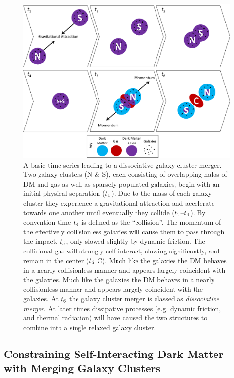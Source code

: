 \begin{figure}
\centering
\includegraphics[width=6in]{Chapter1/MergerTimeSeries.png}
\caption[A basic time series leading to a dissociative galaxy cluster merger.]{A basic time series leading to a dissociative galaxy cluster merger.
Two galaxy clusters (N \& S), each consisting of overlapping halos of DM and gas as well as sparsely populated galaxies, begin with an initial physical separation ($t_{\rm 1}$).
Due to the mass of each galaxy cluster they experience a gravitational attraction and accelerate towards one another until eventually they collide ($t_{\rm 1}$--$t_{\rm 4}$).
By convention time $t_{\rm 4}$ is defined as the ``collision''.
The momentum of the effectively collisionless galaxies will cause them to pass through the impact, $t_{\rm 5}$, only slowed slightly by dynamic friction. 
The collisional gas will strongly self-interact, slowing significantly, and remain in the center ($t_{\rm 6}$ C).
Much like the galaxies the DM behaves in a nearly collisionless manner and appears largely coincident with the galaxies.
Much like the galaxies the DM behaves in a nearly collisionless manner and appears largely coincident with the galaxies.
At $t_{\rm 6}$ the galaxy cluster merger is classed as \emph{dissociative merger}.
At later times dissipative processes (e.g. dynamic friction, and thermal radiation) will have caused the two structures to combine into a single relaxed galaxy cluster.
\label{fig:MergerTimeSeries}}
\end{figure}  

\subsection{Constraining Self-Interacting Dark Matter with Merging Galaxy Clusters}\label{section:DMconstraintWithMergers}

